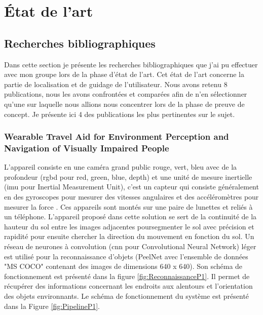 \documentclass[11pt]{article}
\begin{document}
    \pagebreak
  
  \section{État de l'art}  

    \subsection{Recherches bibliographiques}
      Dans cette section je présente les recherches bibliographiques que j'ai pu effectuer avec mon groupe lors de la phase d'état de l'art.
      Cet état de l'art concerne la partie de localisation et de guidage de l'utilisateur. Nous avons retenu 8 publications, nous les avons 
      confrontées et comparées afin de n'en sélectionner qu'une sur laquelle nous allions nous concentrer lors de la phase de preuve de 
      concept. Je présente ici 4 des publications les plus pertinentes sur le sujet.
      
        \subsubsection{Wearable Travel Aid for Environment Perception and Navigation of Visually Impaired People}
          L'appareil consiste en une caméra grand public rouge, vert, bleu avec de la profondeur (\acrshort{rgbd} pour red, green, blue, depth)
          et une unité de mesure inertielle (\acrshort{imu} pour Inertial Measurement Unit), c'est un capteur qui consiste généralement en des gyroscopes 
          pour mesurer des vitesses angulaires et des accéléromètres pour mesurer la force \cite{baiWearableTravelAid2019}. Ces appareils sont montés sur une paire de lunettes
          et reliés à un téléphone. L'appareil proposé dans cette solution se sert de la continuité de la hauteur du sol entre les images 
          adjacentes poursegmenter le sol avec précision et rapidité pour ensuite chercher la direction du mouvement en fonction du sol.
          Un réseau de neurones à convolution (\acrshort{cnn} pour Convolutional Neural Network) léger est utilisé pour la reconnaissance d'objets 
          (PeelNet avec l'ensemble de données "MS COCO" contenant des images de dimensions 640 x 640). Son schéma de fonctionnement est présenté 
          dans la figure \ref{fig:ReconnaissanceP1}. Il permet de récupérer des informations concernant les endroits aux alentours et l'orientation 
          des objets environnants. Le schéma de fonctionnement du système est présenté dans la Figure \ref{fig:PipelineP1}.
\end{document}
